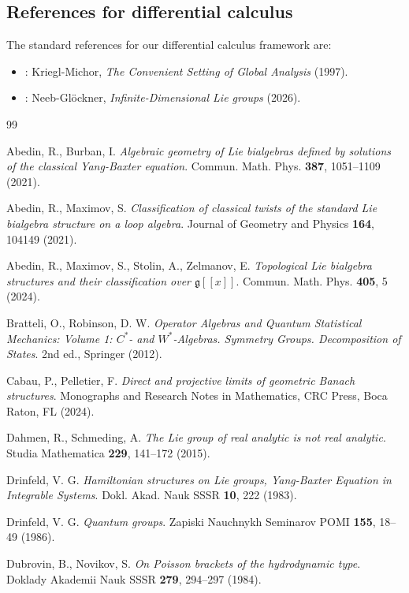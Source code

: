 \documentclass[11pt,reqno]{amsart}
\theoremstyle{definition}
\numberwithin{equation}{section}
\begin{document}
\subsection{References for differential calculus}
The standard references for our differential calculus framework are:
\begin{itemize}
    \item \cite{20}: Kriegl-Michor, \textit{The Convenient Setting of Global Analysis} (1997).
    \item \cite{11}: Neeb-Glöckner, \textit{Infinite-Dimensional Lie groups} (2026).
\end{itemize}


\begin{thebibliography}{99}

 Abedin, R., Burban, I. \textit{Algebraic geometry of Lie bialgebras defined by solutions of the classical Yang-Baxter equation}. Commun. Math. Phys. \textbf{387}, 1051--1109 (2021).

 Abedin, R., Maximov, S. \textit{Classification of classical twists of the standard Lie bialgebra structure on a loop algebra}. Journal of Geometry and Physics \textbf{164}, 104149 (2021).

 Abedin, R., Maximov, S., Stolin, A., Zelmanov, E. \textit{Topological Lie bialgebra structures and their classification over $\mathfrak{g}[[x]]$}. Commun. Math. Phys. \textbf{405}, 5 (2024).

 Bratteli, O., Robinson, D. W. \textit{Operator Algebras and Quantum Statistical Mechanics: Volume 1: $C^*$- and $W^*$-Algebras. Symmetry Groups. Decomposition of States}. 2nd ed., Springer (2012).

 Cabau, P., Pelletier, F. \textit{Direct and projective limits of geometric Banach structures}. Monographs and Research Notes in Mathematics, CRC Press, Boca Raton, FL (2024).

 Dahmen, R., Schmeding, A. \textit{The Lie group of real analytic is not real analytic}. Studia Mathematica \textbf{229}, 141--172 (2015).

 Drinfeld, V. G. \textit{Hamiltonian structures on Lie groups, Yang-Baxter Equation in Integrable Systems}. Dokl. Akad. Nauk SSSR \textbf{10}, 222 (1983).

 Drinfeld, V. G. \textit{Quantum groups}. Zapiski Nauchnykh Seminarov POMI \textbf{155}, 18--49 (1986).

 Dubrovin, B., Novikov, S. \textit{On Poisson brackets of the hydrodynamic type}. Doklady Akademii Nauk SSSR \textbf{279}, 294--297 (1984).


\end{thebibliography}
\end{document}
